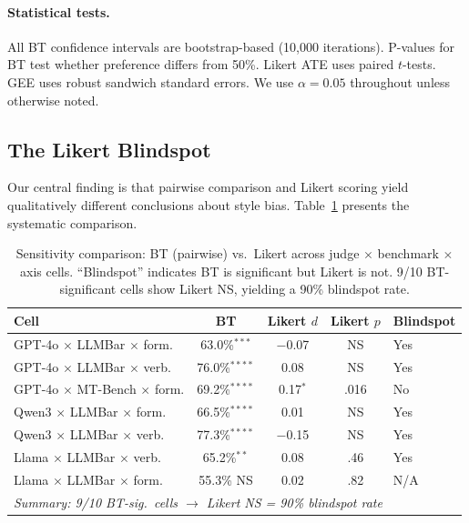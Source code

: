 \documentclass[11pt,a4paper]{article}
\begin{document}
\paragraph{Statistical tests.}
All BT confidence intervals are bootstrap-based (10,000 iterations). P-values for BT test whether preference differs from 50\%. Likert ATE uses paired $t$-tests. GEE uses robust sandwich standard errors. We use $\alpha = 0.05$ throughout unless otherwise noted.

\subsection{The Likert Blindspot}
\label{sec:blindspot}

Our central finding is that pairwise comparison and Likert scoring yield qualitatively different conclusions about style bias. Table~\ref{tab:sensitivity} presents the systematic comparison.

\begin{table}[t]
\centering
\small
\caption{Sensitivity comparison: BT (pairwise) vs.\ Likert across judge $\times$ benchmark $\times$ axis cells. ``Blindspot'' indicates BT is significant but Likert is not. 9/10 BT-significant cells show Likert NS, yielding a 90\% blindspot rate.}
\label{tab:sensitivity}
\begin{tabular}{lcccl}
\toprule
\textbf{Cell} & \textbf{BT} & \textbf{Likert $d$} & \textbf{Likert $p$} & \textbf{Blindspot} \\
\midrule
GPT-4o $\times$ LLMBar $\times$ form. & 63.0\%$^{***}$ & $-$0.07 & NS & Yes \\
GPT-4o $\times$ LLMBar $\times$ verb. & 76.0\%$^{****}$ & 0.08 & NS & Yes \\
GPT-4o $\times$ MT-Bench $\times$ form. & 69.2\%$^{****}$ & 0.17$^{*}$ & .016 & No \\
Qwen3 $\times$ LLMBar $\times$ form. & 66.5\%$^{****}$ & 0.01 & NS & Yes \\
Qwen3 $\times$ LLMBar $\times$ verb. & 77.3\%$^{****}$ & $-$0.15 & NS & Yes \\
Llama $\times$ LLMBar $\times$ verb. & 65.2\%$^{**}$ & 0.08 & .46 & Yes \\
Llama $\times$ LLMBar $\times$ form. & 55.3\% NS & 0.02 & .82 & N/A \\
\midrule
\multicolumn{5}{l}{\textit{Summary: 9/10 BT-sig.\ cells $\to$ Likert NS = 90\% blindspot rate}} \\
\bottomrule
\end{tabular}
\end{table}
\end{document}
